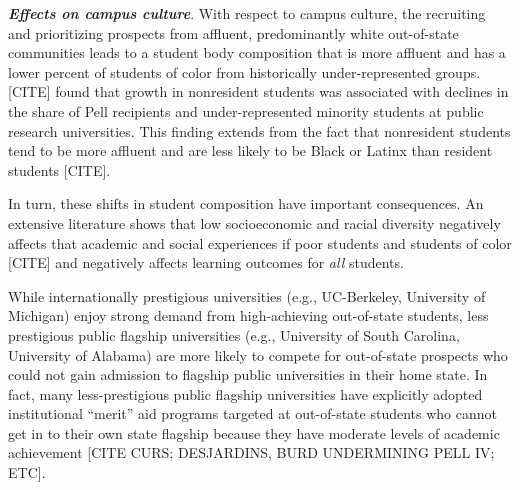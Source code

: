 \documentclass[twoside]{article}
\begin{document}
\textbf{\textit{Effects on campus culture}}.  With respect to campus culture, the recruiting and prioritizing prospects from affluent, predominantly white out-of-state communities leads to a student body composition that is more affluent and has a lower percent of students of color from historically under-represented groups.  [CITE] found that growth in nonresident students was associated with declines in the share of Pell recipients and under-represented minority students at public research universities.  This finding extends from the fact that nonresident students tend to be more affluent and are less likely to be Black or Latinx than resident students [CITE].

In turn, these shifts in student composition have important consequences.  An extensive literature shows that low socioeconomic and racial diversity negatively affects that academic and social experiences if poor students and students of color [CITE] and negatively affects learning outcomes for \textit{all} students.  

While internationally prestigious universities (e.g., UC-Berkeley, University of Michigan) enjoy strong demand from high-achieving out-of-state students, less prestigious public flagship universities (e.g., University of South Carolina, University of Alabama) are more likely to compete for out-of-state prospects who could not gain admission to flagship public universities in their home state.  In fact, many less-prestigious public flagship universities have explicitly adopted institutional ``merit'' aid programs targeted at out-of-state students who cannot get in to their own state flagship because they have moderate levels of academic achievement [CITE CURS; DESJARDINS, BURD UNDERMINING PELL IV; ETC].
\end{document}
